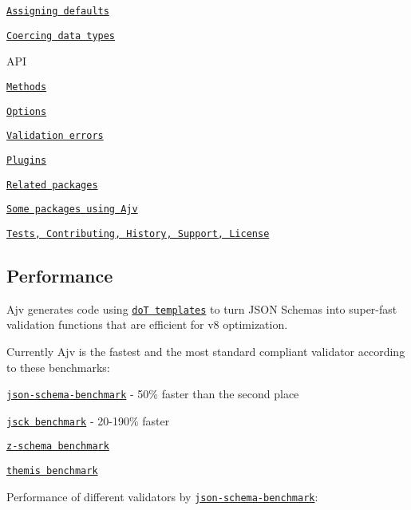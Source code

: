 \begin{DoxyItemize}
\begin{DoxyItemize}
\item \href{#assigning-defaults}{\tt Assigning defaults}
\item \href{#coercing-data-types}{\tt Coercing data types}
\end{DoxyItemize}
\item A\+PI
\begin{DoxyItemize}
\item \href{#api}{\tt Methods}
\item \href{#options}{\tt Options}
\item \href{#validation-errors}{\tt Validation errors}
\end{DoxyItemize}
\item \href{#plugins}{\tt Plugins}
\item \href{#related-packages}{\tt Related packages}
\item \href{#some-packages-using-ajv}{\tt Some packages using Ajv}
\item \href{#tests}{\tt Tests, Contributing, History, Support, License}
\end{DoxyItemize}

\subsection*{Performance}

Ajv generates code using \href{https://github.com/olado/doT}{\tt doT templates} to turn J\+S\+ON Schemas into super-\/fast validation functions that are efficient for v8 optimization.

Currently Ajv is the fastest and the most standard compliant validator according to these benchmarks\+:


\begin{DoxyItemize}
\item \href{https://github.com/ebdrup/json-schema-benchmark}{\tt json-\/schema-\/benchmark} -\/ 50\% faster than the second place
\item \href{https://github.com/pandastrike/jsck#benchmarks}{\tt jsck benchmark} -\/ 20-\/190\% faster
\item \href{https://rawgit.com/zaggino/z-schema/master/benchmark/results.html}{\tt z-\/schema benchmark}
\item \href{https://cdn.rawgit.com/playlyfe/themis/master/benchmark/results.html}{\tt themis benchmark}
\end{DoxyItemize}

Performance of different validators by \href{https://github.com/ebdrup/json-schema-benchmark}{\tt json-\/schema-\/benchmark}\+:

